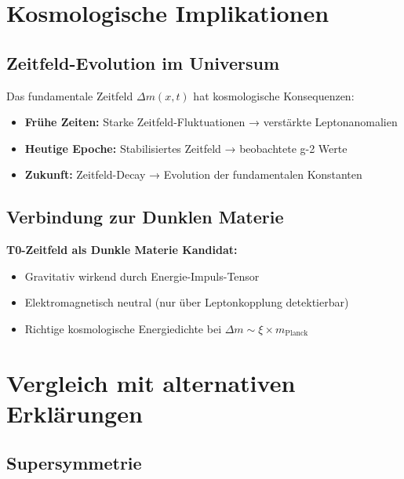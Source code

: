 \documentclass[12pt,a4paper]{article}
\newcommand{\xipar}{\xi}
\newcommand{\Deltam}{\Delta m}
\begin{document}
	\section{Kosmologische Implikationen}
	
	\subsection{Zeitfeld-Evolution im Universum}
	
	Das fundamentale Zeitfeld $\Deltam(x,t)$ hat kosmologische Konsequenzen:
	
	\begin{itemize}
		\item \textbf{Frühe Zeiten:} Starke Zeitfeld-Fluktuationen → verstärkte Leptonanomalien
		\item \textbf{Heutige Epoche:} Stabilisiertes Zeitfeld → beobachtete g-2 Werte
		\item \textbf{Zukunft:} Zeitfeld-Decay → Evolution der fundamentalen Konstanten
	\end{itemize}
	
	\subsection{Verbindung zur Dunklen Materie}
	
	\begin{keyresult}
		\textbf{T0-Zeitfeld als Dunkle Materie Kandidat:}
		
		\begin{itemize}
			\item Gravitativ wirkend durch Energie-Impuls-Tensor
			\item Elektromagnetisch neutral (nur über Leptonkopplung detektierbar)
			\item Richtige kosmologische Energiedichte bei $\Deltam \sim \xipar \times m_{\text{Planck}}$
		\end{itemize}
	\end{keyresult}
	
		\section{Vergleich mit alternativen Erklärungen}
	
	\subsection{Supersymmetrie}
	
\end{document}
